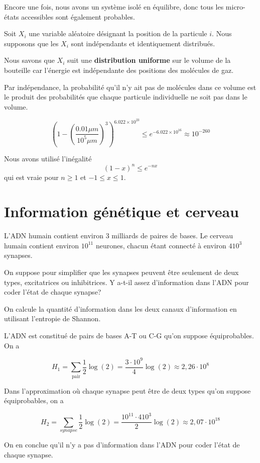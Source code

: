 \documentclass[french]{article}
\begin{document}
	Encore une fois, nous avons un système isolé en équilibre, donc tous les micro-états accessibles sont également probables.
	
	Soit \(X_i\) une variable aléatoire désignant la position de la particule \(i\). Nous supposons que les \(X_i\) sont indépendants et identiquement distribués.
	
	Nous savons que \(X_i\) suit une \textbf{distribution uniforme} sur le volume de la bouteille car l'énergie est indépendante des positions des molécules de gaz.
	
	Par indépendance, la probabilité qu'il n'y ait pas de molécules dans ce volume est le produit des probabilités que chaque particule individuelle ne soit pas dans le volume.
	
	\[ \left( 1 - \left(\frac{0.01 \mu m}{10^5 \mu m}\right)^3 \right)^{6.022 \times 10^{23}} \leq e^{-6.022 \times 10^{16}} \approx 10^{-260} \]
	
	\begin{tcolorbox}[colback=yellow!5!white,colframe=yellow!75!black]
		Nous avons utilisé l'inégalité
		\[ (1-x)^n \leq e^{-nx} \]
		qui est vraie pour \( n \geq 1\) et \( -1 \leq x \leq 1 \).
	\end{tcolorbox}

	\section{Information génétique et cerveau}
	\begin{tcolorbox}[colback=blue!5!white,colframe=blue!75!black]
		\quad L'ADN humain contient environ $3$ milliards de paires de bases. Le cerveau humain contient environ $10^{11}$ neurones, chacun étant connecté à environ 	$410^3$ synapses.
		
		\quad On suppose pour simplifier que les synapses peuvent être seulement de deux types, excitatrices ou inhibitrices. Y a-t-il assez d'information dans l'ADN pour coder l'état de chaque synapse?
	\end{tcolorbox}

	On calcule la quantité d'information dans les deux canaux d'information en utilisant l'entropie de Shannon.
	
	L'ADN est constitué de pairs de bases A-T ou C-G qu'on suppose équiprobables. On a
	
	$$ H_1 = \sum_{\text{pair}} \frac{1}{2} \log(2) = \frac{3 \cdot 10^9}{4} \log(2) \approx 2,26 \cdot 10^{8} $$
	
	Dans l'approximation où chaque synapse peut être de deux types qu'on suppose équiprobables, on a
	
	$$ H_2 = \sum_{synapse} \frac{1}{2} \log(2) = \frac{10^{11} \cdot 410^3}{2}\log(2) \approx 2,07 \cdot 10^{18}$$
	
	On en conclue qu'il n'y a pas d'information dans l'ADN pour coder l'état de chaque synapse.
	
\end{document}
